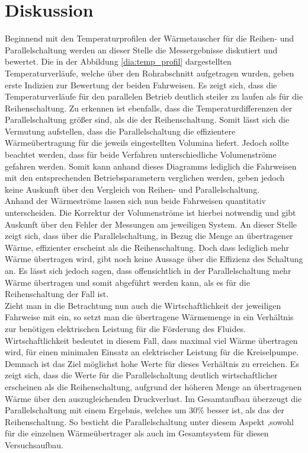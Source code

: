\section{Diskussion}
\label{sec:diskussion}
Beginnend mit den Temperaturprofilen der Wärmetauscher für die Reihen- und Parallelschaltung werden an dieser Stelle die Messergebnisse diskutiert und bewertet. Die in der Abbildung \ref{dia:temp_profil} dargestellten Temperaturverläufe, welche über den Rohrabschnitt aufgetragen wurden,  geben erste Indizien zur Bewertung der beiden Fahrweisen. Es zeigt sich, dass die Temperaturverläufe für den parallelen Betrieb deutlich steiler zu laufen als für die Reihenschaltung. Zu erkennen ist ebenfalls, dass die Temperaturdifferenzen der Parallelschaltung größer sind, als die der Reihenschaltung. Somit lässt sich die Vermutung aufstellen, dass die Parallelschaltung die effizientere Wärmeübertragung für die jeweils eingestellten Volumina liefert. Jedoch sollte beachtet werden, dass für beide Verfahren unterschiedliche Volumenströme gefahren werden. Somit kann anhand dieses Diagramms lediglich die Fahrweisen mit den entsprechenden Betriebsparametern verglichen werden, geben jedoch keine Auskunft über den Vergleich von Reihen- und Parallelschaltung.\\

Anhand der Wärmeströme lassen sich nun beide Fahrweisen quantitativ unterscheiden. Die Korrektur der Volumenströme ist hierbei notwendig und gibt Auskunft über den Fehler der Messungen am jeweiligen System. An dieser Stelle zeigt sich, dass über die Parallelschaltung, in Bezug  die Menge an übertragener Wärme,  effizienter erscheint als die Reihenschaltung. Doch dass lediglich mehr Wärme übertragen wird, gibt noch keine Aussage über die Effizienz des Schaltung an. Es lässt sich jedoch sagen, dass offensichtlich in der Parallelschaltung mehr Wärme übertragen und somit abgeführt werden kann, als es für die Reihenschaltung der Fall ist.\\

Zieht man in die Betrachtung nun auch die Wirtschaftlichkeit der jeweiligen Fahrweise mit ein, so setzt man die übertragene Wärmemenge in ein Verhältnis zur benötigen elektrischen Leistung für die Förderung des Fluides. Wirtschaftlichkeit bedeutet in diesem Fall, dass maximal viel Wärme übertragen wird, für einen minimalen Einsatz an elektrischer Leistung für die Kreiselpumpe. Demnach ist das Ziel möglichst hohe Werte für dieses Verhältnis zu erreichen. Es zeigt sich, dass die Werte für die Parallelschaltung deutlich wirtschaftlicher erscheinen als die Reihenschaltung, aufgrund der höheren Menge an übertragenen Wärme über den auszugleichenden Druckverlust. Im Gesamtaufbau überzeugt die Parallelschaltung mit einem Ergebnis, welches um 30\% besser ist, als das der Reihenschaltung.
So besticht die Parallelschaltung unter diesem Aspekt ,sowohl für die einzelnen Wärmeübertrager als auch im Gesamtsystem für diesen Versuchsaufbau. \\

